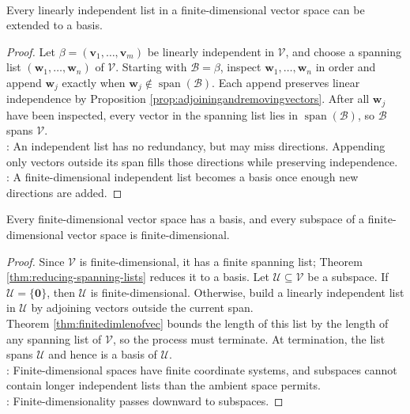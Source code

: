 \begin{theorem} \label{thm:extending-independent-lists} \\
Every linearly independent list in a finite-dimensional vector space can be extended to a basis.
\begin{proof}
Let $\beta=(\mathbf{v}_1,\ldots,\mathbf{v}_m)$ be linearly independent in $\mathcal{V}$, and choose a spanning list $(\mathbf{w}_1,\ldots,\mathbf{w}_n)$ of $\mathcal{V}$. Starting with $\mathcal{B}=\beta$, inspect $\mathbf{w}_1,\ldots,\mathbf{w}_n$ in order and append $\mathbf{w}_j$ exactly when $\mathbf{w}_j\notin\operatorname{span}(\mathcal{B})$. Each append preserves linear independence by Proposition \ref{prop:adjoiningandremovingvectors}. After all $\mathbf{w}_j$ have been inspected, every vector in the spanning list lies in $\operatorname{span}(\mathcal{B})$, so $\mathcal{B}$ spans $\mathcal{V}$.\\
: An independent list has no redundancy, but may miss directions. Appending only vectors outside its span fills those directions while preserving independence.\\
: A finite-dimensional independent list becomes a basis once enough new directions are added.
\end{proof}
\end{theorem}

\begin{corollary} \label{cor:finite-dimensional-spaces-and-subspaces-have-bases}
Every finite-dimensional vector space has a basis, and every subspace of a finite-dimensional vector space is finite-dimensional.
\begin{proof}
Since $\mathcal{V}$ is finite-dimensional, it has a finite spanning list; Theorem \ref{thm:reducing-spanning-lists} reduces it to a basis. Let $\mathcal{U}\subseteq\mathcal{V}$ be a subspace. If $\mathcal{U}=\{\mathbf{0}\}$, then $\mathcal{U}$ is finite-dimensional. Otherwise, build a linearly independent list in $\mathcal{U}$ by adjoining vectors outside the current span.\\
Theorem \ref{thm:finitedimlenofvec} bounds the length of this list by the length of any spanning list of $\mathcal{V}$, so the process must terminate. At termination, the list spans $\mathcal{U}$ and hence is a basis of $\mathcal{U}$.\\
: Finite-dimensional spaces have finite coordinate systems, and subspaces cannot contain longer independent lists than the ambient space permits.\\
: Finite-dimensionality passes downward to subspaces.
\end{proof}
\end{corollary}

